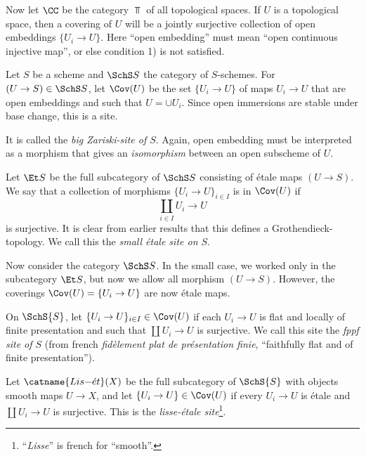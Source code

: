\documentclass[11pt, english]{article}
\begin{document}
\begin{example}
Now let $\CC$ be the category $\Top$ of all topological spaces. If $U$ is a topological space, then a covering of $U$ will be a jointly surjective collection of open embeddings $\{ U_i \to U\}$. Here ``open embedding'' must mean ``open continuous injective map'', or else condition 1) is not satisfied.
\end{example}

\begin{example}
Let $S$ be a scheme and $\SchS S$ the category of $S$-schemes. For $(U \to S) \in \SchS S$, let $\Cov(U)$ be the set $\{ U_i \to U\}$ of maps $U_i \to U$ that are open embeddings and such that $U = \cup U_i$. Since open immersions are stable under base change, this is a site.

It is called the \emph{big Zariski-site of $S$}. Again, open embedding must be interpreted as a morphism that gives an \emph{isomorphism} between an open subscheme of $U$. 
\end{example}

\begin{example}
Let $\Et S$ be the full subcategory of $\SchS S$ consisting of étale maps $(U \to S)$. We say that a collection of morphisms $\{ U_i \to U \}_{i \in I}$ is in $\Cov(U)$ if
\[
\coprod_{i \in I} U_i \to U
\]
is surjective. It is clear from earlier results that this defines a Grothendieck-topology. We call this the \emph{small étale site on $S$}. 
\end{example}

\begin{example}
Now consider the category $\SchS S$. In the small case, we worked only in the subcategory $\Et S$, but now we allow all morphism $(U \to S)$. However, the coverings $\Cov(U) = \{ U_i \to U \}$ are now étale maps. 
\end{example}

\begin{example}
On $\SchS{S}$, let $ \{ U_i \to U\}_{i \in I} \in \Cov(U)$ if each $U_i \to U$ is flat and locally of finite presentation and such that $\coprod U_i \to U$ is surjective. We call this site the \emph{fppf site of $S$} (from french \emph{fidèlement plat de présentation finie}, ``faithfully flat and of finite presentation'').
\end{example}

\begin{example}
Let $\catname{Lis\mathrm{-}\acute{e}t}(X)$ be the full subcategory of $\SchS{S}$ with objects smooth maps $U \to X$, and let $\{U_i \to U\} \in \Cov(U)$ if every $U_i \to U$ is étale and $\coprod U_i \to U$ is surjective. This is the \emph{lisse-étale site}\footnote{``\emph{Lisse}'' is french for ``smooth''.}.
\end{example}
\end{document}
